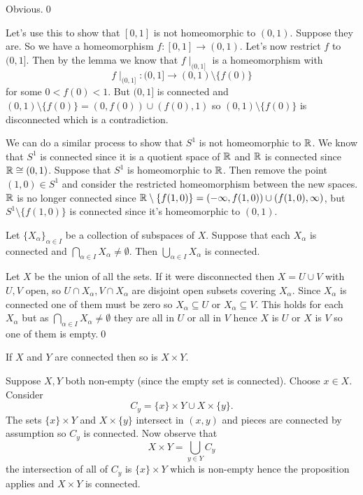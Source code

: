 \documentclass{article}
\begin{document}
\pf Obvious.\qed
\par
Let's use this to show that $ [0,1] $ is not homeomorphic to $ (0,1) $. Suppose they are. So we have a homeomorphism $ f:[0,1]\to (0,1) $. Let's now restrict $ f $ to $ (0,1] $. Then by the lemma we know that $ f\mid_{(0,1]} $ is a homeomorphism with
\[
	f\mid_{(0,1]}: (0,1]\to (0,1)\setminus \{f(0)\}
\]
for some $ 0<f(0)<1 $. But $ (0,1] $ is connected and $ (0,1)\setminus \{f(0)\}=(0,f(0))\cup (f(0),1) $ so $ (0,1)\setminus\{f(0)\} $ is disconnected which is a contradiction.\par
We can do a similar process to show that $ S^1 $ is not homeomorphic to $ \mathbb{R} $. We know that $ S^1 $ is connected since it is a quotient space of $ \mathbb{R} $ and $ \mathbb{R} $ is connected since $ \mathbb{R}\cong (0,1) $. Suppose that $ S^1 $ is homeomorphic to $ \mathbb{R} $. Then remove the point $ (1,0)\in S^1 $ and consider the restricted homeomorphism between the new spaces. $ \mathbb{R} $ is no longer connected since $ \mathbb{R}\setminus \{f(1,0)\} = (-\infty, f(1,0))\cup (f(1,0),\infty) $, but $ S^1\setminus \{f(1,0)\} $ is connected since it's homeomorphic to $ (0,1) $.
\begin{proposition}
	Let $ \{ X_\alpha\}_{\alpha \in I} $ be a collection of subspaces of $ X $. Suppose that each $ X_\alpha $ is connected and $ \bigcap_{\alpha\in I} X_\alpha\ne\emptyset $. Then $ \bigcup_{\alpha \in I} X_\alpha $ is connected.
\end{proposition}
\pf Let $ X $ be the union of all the sets. If it were disconnected then $ X = U \cup V $ with $ U,V $ open, so $ U\cap X_\alpha, V\cap X_\alpha $ are disjoint open subsets covering $ X_\alpha $. Since $ X_\alpha $ is connected one of them must be zero so $ X_\alpha\subseteq U $ or $ X_\alpha\subseteq V $. This holds for each $ X_\alpha $ but as $ \bigcap_{\alpha\in I} X_\alpha \ne\emptyset $ they are all in $ U $ or all in $ V $ hence $ X $ is $ U $ or $ X $ is $ V $ so one of them is empty.\qed
\begin{corollary}
  If $ X $ and $ Y $ are connected then so is $ X\times Y $.
\end{corollary}
\pf Suppose $ X,Y $ both non-empty (since the empty set is connected). Choose $ x\in X $. Consider
\[
	C_y = \{ x\} \times Y \cup X\times \{y\}.
\]
The sets $ \{x\}\times Y $ and $ X\times \{y\} $ intersect in $ (x,y) $ and pieces are connected by assumption so $ C_y $ is connected. Now observe that
\[
	X\times Y = \bigcup_{y\in Y} C_y
\]
the intersection of all of $ C_y $ is $ \{x\}\times Y $ which is non-empty hence the proposition applies and $ X\times Y $ is connected.
\end{document}

